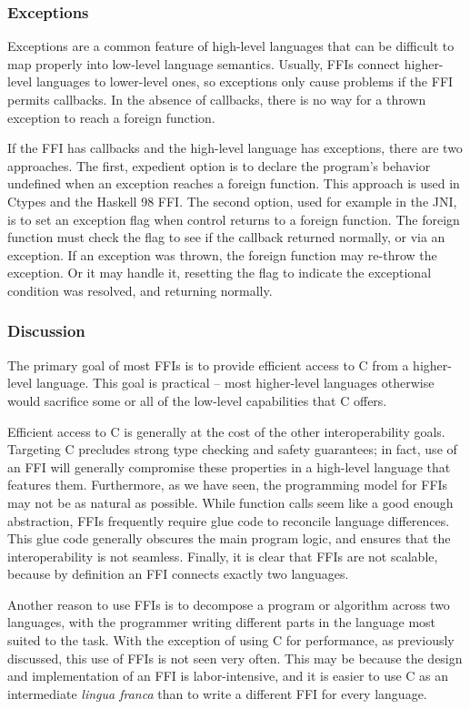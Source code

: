 \subsubsection{Exceptions}
\label{sec:ffi:exceptions}

Exceptions are a common feature of high-level languages that can
be difficult to map properly into low-level language semantics.
Usually, FFIs connect higher-level languages to lower-level ones,
so exceptions only cause problems if the FFI permits callbacks. In
the absence of callbacks, there is no way for a thrown exception
to reach a foreign function.

If the FFI has callbacks and the high-level language has
exceptions, there are two approaches. The first, expedient option
is to declare the program's behavior undefined when an exception
reaches a foreign function. This approach is used in Ctypes and
the Haskell 98 FFI. The second option, used for example in the
JNI, is to set an exception flag when control returns to a foreign
function. The foreign function must check the flag to see if the
callback returned normally, or via an exception. If an exception
was thrown, the foreign function may re-throw the exception. Or it
may handle it, resetting the flag to indicate the exceptional
condition was resolved, and returning normally.

\subsubsection{Discussion}

The primary goal of most FFIs is to provide efficient access to C
from a higher-level language. This goal is practical -- most
higher-level languages otherwise would sacrifice some or all of
the low-level capabilities that C offers.

Efficient access to C is generally at the cost of the other
interoperability goals. Targeting C precludes strong type checking
and safety guarantees; in fact, use of an FFI will generally
compromise these properties in a high-level language that features
them. Furthermore, as we have seen, the programming model for FFIs
may not be as natural as possible. While function calls seem like
a good enough abstraction, FFIs frequently require glue code to
reconcile language differences. This glue code generally obscures
the main program logic, and ensures that the interoperability is
not seamless. Finally, it is clear that FFIs are not scalable,
because by definition an FFI connects exactly two languages.

Another reason to use FFIs is to decompose a program or algorithm
across two languages, with the programmer writing different parts
in the language most suited to the task. With the exception of
using C for performance, as previously discussed, this use of FFIs
is not seen very often. This may be because the design and
implementation of an FFI is labor-intensive, and it is easier to
use C as an intermediate \emph{lingua franca} than to write a
different FFI for every language.
